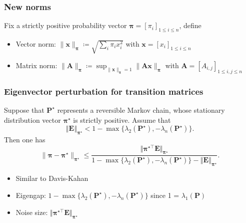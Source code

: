\documentclass[compress,
mathserif,wide,%
]{beamer}
\begin{document}
\begin{frame}
	\frametitle{New norms}
	Fix a strictly positive probability vector $\bm{\pi}=[\pi_i]_{1\leq i\leq n}$, define 
	
	\vspace{1em}
	\begin{itemize}
		\item Vector norm: $\|\bm{x}\|_{\bm{\pi}} \coloneqq \sqrt{\sum_i \pi_i x_i^2}$ with $\bm{x}=[x_i]_{1\leq i\leq n}$
		\item Matrix norm: $\|\bm{A}\|_{\bm{\pi}} \coloneqq  \sup_{\|\bm{x}\|_{\bm{\pi}}=1}\|\bm{A}\bm{x}\|_{\bm{\pi}}$ with $\bm{A}=[A_{i,j}]_{1\leq i, j \leq n}$
	\end{itemize}
\end{frame}

\begin{frame}
	\frametitle{Eigenvector perturbation for transition matrices}



\begin{theorem}
\label{thm:DK_asym}
	Suppose that $\bm{P}^{\star}$ represents a reversible Markov chain, whose stationary distribution vector $\bm{\pi}^{\star}$ is strictly positive.  Assume that
%
\begin{equation*}
	\left\Vert \bm{E}\right\Vert _{\bm{\pi}^{\star}}
	< 1-\max\big\{ \lambda_{2}(\bm{P}^{\star}),-\lambda_{n}(\bm{P}^{\star})\big\} .
\end{equation*}
%
Then one has
%
\[
	\|\bm{\pi}-\bm{\pi}^{\star}\|_{\bm{\pi}^{\star}}
	\leq
	\frac{\big\Vert \bm{\pi}^{\star\top}\bm{E}\big\Vert _{\bm{\pi}^{\star}}}{1-\max\big\{ \lambda_{2}(\bm{P}^{\star}),-\lambda_{n}(\bm{P}^{\star})\big\}
	-\left\Vert \bm{E}\right\Vert _{\bm{\pi}^{\star}}}.
\]
%
\end{theorem}

\vfill
\begin{itemize}
	\item Similar to Davis-Kahan
	\item Eigengap: $1-\max\big\{ \lambda_{2}(\bm{P}^{\star}),-\lambda_{n}(\bm{P}^{\star})\big\}$ since 1 = $\lambda_{1}(\bm{P})$
	\item Noise size: $\big\Vert \bm{\pi}^{\star\top}\bm{E}\big\Vert _{\bm{\pi}^{\star}}$
\end{itemize}
\end{frame}
\end{document}
